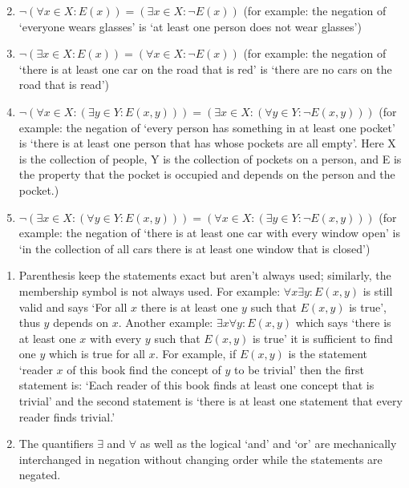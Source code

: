 \begin{example}
\begin{enumerate}[label=(\alph*)]
$$            $$
        \item $\neg (\forall x \in X : E(x)) = (\exists x \in X : \neg E(x))$ (for example: the negation of `everyone wears glasses' is `at least one person does not wear glasses')
        \item $\neg (\exists x \in X : E(x)) = (\forall x \in X : \neg E(x))$ (for example: the negation of `there is at least one car on the road that is red' is `there are no cars on the road that is read')
        \item $\neg (\forall x \in X : (\exists y \in Y : E(x,y))) = (\exists x \in X : (\forall y \in Y : \neg E(x,y)))$ (for example: the negation of `every person has something in at least one pocket' is `there is at least one person that has whose pockets are all empty'. Here X is the collection of people, Y is the collection of pockets on a person, and E is the property that the pocket is occupied and depends on the person and the pocket.)
        \item $\neg (\exists x \in X : (\forall y \in Y : E(x,y))) = (\forall x \in X : (\exists y \in Y : \neg E(x,y)))$ (for example: the negation of `there is at least one car with every window open' is `in the collection of all cars there is at least one window that is closed')
    \end{enumerate}
\end{example}

\begin{remark}
    \begin{enumerate}[label=(\alph*)]
        \item Parenthesis keep the statements exact but aren't always used; similarly, the membership symbol is not always used. For example: $\forall x \exists y : E(x,y)$ is still valid and says `For all $x$ there is at least one $y$ such that $E(x,y)$ is true', thus $y$ depends on $x$. Another example: $\exists x \forall y : E(x,y)$ which says `there is at least one $x$ with every $y$ such that $E(x,y)$ is true' it is sufficient to find one $y$ which is true for all $x$. For example, if $E(x,y)$ is the statement `reader $x$ of this book find the concept of $y$ to be trivial' then the first statement is: `Each reader of this book finds at least one concept that is trivial' and the second statement is `there is at least one statement that every reader finds trivial.'
        \item The quantifiers $\exists$ and $\forall$ as well as the logical `and' and `or' are mechanically interchanged in negation without changing order while the statements are negated.
    \end{enumerate}
\end{remark}

